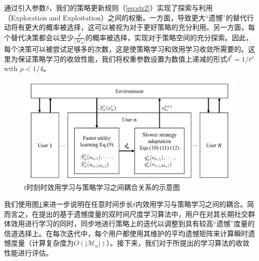 通过引入参数$\delta$，我们的策略更新规则（\ref{eq:str2}）实现了探索与利用（Exploration and Exploitation）之间的权衡。一方面，导致更大“遗憾”的替代行动将有更大的概率被选择，这可以被视为对于更好策略的充分利用。另一方面，每个替代决策都会以至少$\frac{\delta^t}{|\mathcal{M}_n|}$的概率被选择，实现对于策略空间的充分探索。因此，每个决策可以被尝试足够多的次数，这是使策略学习和效用学习收敛所需要的。这里为保证策略学习的收敛性能，我们将权重参数设置为数值上递减的形式$\delta^t=1/t^\rho$ with $\rho<1/4$。
\begin{figure}[!t]
\centering
\includegraphics[scale=0.76]{./pic/scheme2.pdf}
\caption{$t$时刻时效用学习与策略学习之间耦合关系的示意图}\label{fg:scheme}
\end{figure}
我们使用图\ref{fg:scheme}来进一步说明在任意时间步长$t$内效用学习与策略学习之间的耦合。简而言之，在提出的基于遗憾度量的双时间尺度学习算法中，用户在对其长期社交群体效用进行学习的同时，同步地进行策略上的迭代以调整到具有较高“遗憾”度量的信道选择上。在每次迭代中，每个用户都使用其维护的平均遗憾矩阵来计算瞬时遗憾度量（计算复杂度为$O(|\mathcal{M}_n|)$）。接下来，我们对于所提出的学习算法的收敛性能进行评估。
